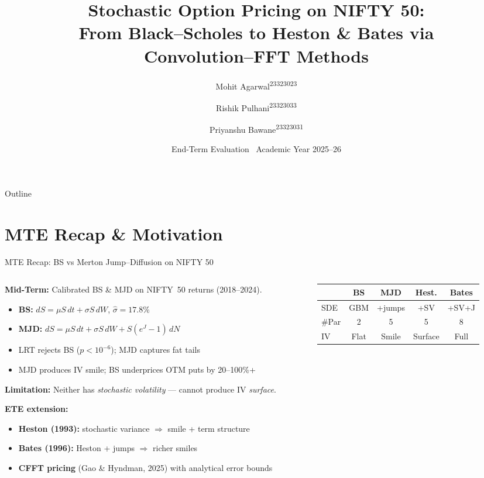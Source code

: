 \documentclass[10pt, aspectratio=169]{beamer}
\title[Stochastic Option Pricing on NIFTY 50]{Stochastic Option Pricing on NIFTY 50:\\
From Black--Scholes to Heston \& Bates via\\Convolution--FFT Methods}
\author[M.\,Agarwal, R.\,Pulhani, P.\,Bawane]{%
  Mohit Agarwal\textsuperscript{23323023} \and
  Rishik Pulhani\textsuperscript{23323033} \and
  Priyanshu Bawane\textsuperscript{23323031}}
\institute{Department of Mathematics, IIT Roorkee\\
  Under supervision of \textbf{Prof.\ Chaman Kumar}}
\date{End-Term Evaluation \textbar\ Academic Year 2025--26}
\begin{document}
\begin{frame}
\titlepage
\end{frame}

\begin{frame}{Outline}
\tableofcontents
\end{frame}

\section{MTE Recap \& Motivation}

\begin{frame}{MTE Recap: BS vs Merton Jump--Diffusion on NIFTY 50}
\begin{columns}[T]
\begin{column}{0.52\textwidth}
\textbf{Mid-Term:} Calibrated BS \& MJD on NIFTY~50 returns (2018--2024).
\begin{itemize}\setlength\itemsep{2pt}
  \item \textbf{BS:} $dS = \mu S\,dt + \sigma S\,dW$, \; $\hat\sigma = 17.8\%$
  \item \textbf{MJD:} $dS = \mu S\,dt + \sigma S\,dW + S(e^J{-}1)\,dN$
  \item LRT rejects BS ($p < 10^{-6}$); MJD captures fat tails
  \item MJD produces IV smile; BS underprices OTM puts by 20--100\%+
\end{itemize}
\vspace{3pt}
\textbf{Limitation:} Neither has \emph{stochastic volatility} --- cannot produce IV \emph{surface}.

\vspace{3pt}
\textbf{ETE extension:}
\begin{itemize}\setlength\itemsep{1pt}
  \item \textbf{Heston (1993):} stochastic variance $\Rightarrow$ smile + term structure
  \item \textbf{Bates (1996):} Heston + jumps $\Rightarrow$ richer smiles
  \item \textbf{CFFT pricing} (Gao \& Hyndman, 2025) with analytical error bounds
\end{itemize}
\end{column}
\begin{column}{0.46\textwidth}
\small
\begin{tabular}{lcccc}
\toprule
 & \textbf{BS} & \textbf{MJD} & \textbf{Hest.} & \textbf{Bates} \\
\midrule
SDE & GBM & +jumps & +SV & +SV+J \\
\#Par & 2 & 5 & 5 & 8 \\
IV & Flat & Smile & Surface & Full \\
\bottomrule
\end{tabular}
\vspace{4pt}


\end{column}
\end{columns}
\end{frame}
\end{document}
